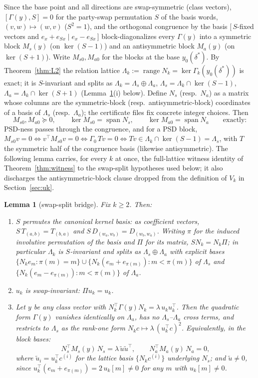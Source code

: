 \documentclass[11pt]{article}
\newtheorem{lemma}[theorem]{Lemma}
\newcommand{\lam}{\lambda}
\DeclareMathOperator{\range}{range}
\DeclareMathOperator{\Span}{span}
\begin{document}
Since the base point and all directions are swap-symmetric (class
vectors), $[\Gamma(y),S]=0$ for the party-swap permutation $S$ of the
basis words, $(v,w)\mapsto(w,v)$ ($S^2=1$), and the orthogonal congruence
by the basis $[\,S$-fixed vectors and $e_x+e_{Sx}\mid e_x-e_{Sx}\,]$
block-diagonalizes every $\Gamma(y)$ into a symmetric block $M_s(y)$ (on
$\ker(S-1)$) and an antisymmetric block $M_a(y)$ (on $\ker(S+1)$). Write
$M_{s0},M_{a0}$ for the blocks at the base $y_0(\delta^\ast)$. By
Theorem~\ref{thm:L2} the relation lattice
$\Lambda_k:=\range N_k=\ker\Gamma_k(y_0(\delta^\ast))$ is exact; it is
$S$-invariant and splits as $\Lambda_k=\Lambda_s\oplus\Lambda_a$,
$\Lambda_s=\Lambda_k\cap\ker(S-1)$, $\Lambda_a=\Lambda_k\cap\ker(S+1)$
(Lemma~\ref{lem:bridge}(i) below). Define $N_s$ (resp.\ $N_a$) as a matrix
whose columns are the symmetric-block (resp.\ antisymmetric-block)
coordinates of a basis of $\Lambda_s$ (resp.\ $\Lambda_a$); the
certificate files fix concrete integer choices. Then
\[
M_{s0},M_{a0}\succeq0,\qquad \ker M_{s0}=\Span N_s,\qquad
\ker M_{a0}=\Span N_a\qquad\text{exactly:}
\]
PSD-ness passes through the congruence, and for a PSD block,
$M_{s0}v=0\iff v^\top M_{s0}v=0\iff\Gamma_0\,Tv=0\iff
Tv\in\Lambda_k\cap\ker(S-1)=\Lambda_s$, with $T$ the symmetric half of the
congruence basis (likewise antisymmetric). The following lemma carries,
for every $k$ at once, the full-lattice witness identity of
Theorem~\ref{thm:witness} to the swap-split hypotheses used below; it also
discharges the antisymmetric-block clause dropped from the definition of
$V_k$ in Section~\ref{sec:uk}.

\begin{lemma}[swap-split bridge]\label{lem:bridge}
Fix $k\ge2$. Then:
\begin{enumerate}
\item $S$ permutes the canonical kernel basis: as coefficient vectors,
  $S\,T_{(a,b)}=T_{(b,a)}$ and $S\,D_{(w_a,w_b)}=D_{(w_b,w_a)}$. Writing
  $\pi$ for the induced involutive permutation of the basis and $\Pi$ for
  its matrix, $SN_k=N_k\Pi$; in particular $\Lambda_k$ is $S$-invariant
  and splits as $\Lambda_s\oplus\Lambda_a$ with explicit bases
  $\{N_ke_m:\pi(m)=m\}\cup\{N_k(e_m+e_{\pi(m)}):m<\pi(m)\}$ of $\Lambda_s$
  and $\{N_k(e_m-e_{\pi(m)}):m<\pi(m)\}$ of $\Lambda_a$.
\item $u_k$ is swap-invariant: $\Pi u_k=u_k$.
\item Let $y$ be any class vector with
  $N_k^\top\Gamma(y)N_k=\lam\,u_ku_k^\top$. Then the quadratic form
  $\Gamma(y)$ vanishes identically on $\Lambda_a$, has no
  $\Lambda_s$--$\Lambda_a$ cross terms, and restricts to $\Lambda_s$ as
  the rank-one form $N_kc\mapsto\lam\,(u_k^\top c)^2$. Equivalently, in
  the block bases:
  \[
  N_s^\top M_s(y)\,N_s=\lam\,\tilde u\tilde u^\top,\qquad
  N_a^\top M_a(y)\,N_a=0,
  \]
  where $\tilde u_i=u_k^\top c^{(i)}$ for the lattice basis
  $\{N_kc^{(i)}\}$ underlying $N_s$; and $\tilde u\ne0$, since
  $u_k^\top(e_m+e_{\pi(m)})=2\,u_k[m]\ne0$ for any $m$ with
  $u_k[m]\ne0$.
\end{enumerate}
\end{lemma}
\end{document}
